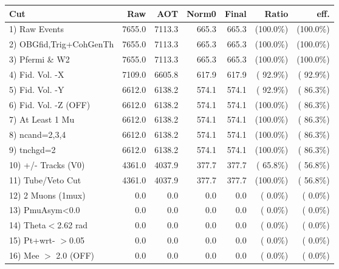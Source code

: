  \begin{table}[h!]\centering
 \begin{tabular}{||l||r|r|r|r|r|r||}
 \hline
 \hline
 Cut & Raw & AOT & Norm0 & Final & Ratio & eff.       \\
 \hline
  1) Raw Events           &       7655.0 &       7113.3 &        665.3 &        665.3 & (100.0\%) & (100.0\%) \\
  2) OBGfid,Trig+CohGenTh &       7655.0 &       7113.3 &        665.3 &        665.3 & (100.0\%) & (100.0\%) \\
  3) Pfermi \& W2         &       7655.0 &       7113.3 &        665.3 &        665.3 & (100.0\%) & (100.0\%) \\
  4) Fid. Vol. -X         &       7109.0 &       6605.8 &        617.9 &        617.9 & ( 92.9\%) & ( 92.9\%) \\
  5) Fid. Vol. -Y         &       6612.0 &       6138.2 &        574.1 &        574.1 & ( 92.9\%) & ( 86.3\%) \\
  6) Fid. Vol. -Z (OFF)   &       6612.0 &       6138.2 &        574.1 &        574.1 & (100.0\%) & ( 86.3\%) \\
  7) At Least 1 Mu        &       6612.0 &       6138.2 &        574.1 &        574.1 & (100.0\%) & ( 86.3\%) \\
  8) ncand=2,3,4          &       6612.0 &       6138.2 &        574.1 &        574.1 & (100.0\%) & ( 86.3\%) \\
  9) tnchgd=2             &       6612.0 &       6138.2 &        574.1 &        574.1 & (100.0\%) & ( 86.3\%) \\
 10) +/- Tracks (V0)      &       4361.0 &       4037.9 &        377.7 &        377.7 & ( 65.8\%) & ( 56.8\%) \\
 11) Tube/Veto Cut        &       4361.0 &       4037.9 &        377.7 &        377.7 & (100.0\%) & ( 56.8\%) \\
 12) 2 Muons (1mux)       &          0.0 &          0.0 &          0.0 &          0.0 & (  0.0\%) & (  0.0\%) \\
 13) PmuAsym<0.0          &          0.0 &          0.0 &          0.0 &          0.0 & (  0.0\%) & (  0.0\%) \\
 14) Theta$<$2.62 rad     &          0.0 &          0.0 &          0.0 &          0.0 & (  0.0\%) & (  0.0\%) \\
 15) Pt+wrt- $>$0.05      &          0.0 &          0.0 &          0.0 &          0.0 & (  0.0\%) & (  0.0\%) \\
 16) Mee $>$ 2.0  (OFF)   &          0.0 &          0.0 &          0.0 &          0.0 & (  0.0\%) & (  0.0\%) \\

\end{tabular}
\end{table}
